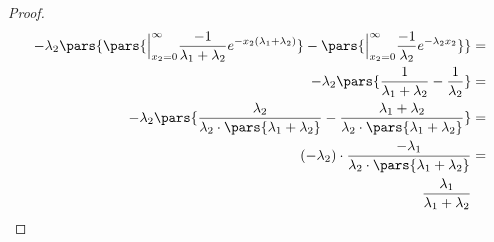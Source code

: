 \begin{proof}
\begin{align*}
		-\lambda_2 \pars{\pars{\Big\rvert_{x_2=0}^{\infty} \frac{-1}{\lambda_1 + \lambda_2} e^{-x_2(\lambda_1 + \lambda_2)}} - \pars{\Big\rvert_{x_2=0}^{\infty} \frac{-1}{\lambda_2} e^{-\lambda_2 x_2}}} & = \\
		-\lambda_2 \pars{\frac{1}{\lambda_1 + \lambda_2} - \frac{1}{\lambda_2}}                                                                                                                            & = \\
		-\lambda_2 \pars{\frac{\lambda_2}{\lambda_2 \cdot \pars{\lambda_1 + \lambda_2}} - \frac{\lambda_1 + \lambda_2}{\lambda_2 \cdot \pars{\lambda_1 + \lambda_2}}}                                      & = \\
		(-\lambda_2)\cdot \frac{-\lambda_1}{\lambda_2 \cdot \pars{\lambda_1 + \lambda_2}}                                                                                                                  & = \\
		\frac{\lambda_1}{\lambda_1 + \lambda_2}
	\end{align*}
\end{proof}